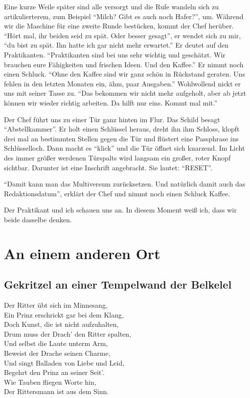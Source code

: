 \documentclass[final]{multiversum}
\begin{document}
Eine kurze Weile später sind alle versorgt und die Rufe wandeln sich zu artikulierterem, zum Beispiel \enquote{Milch? Gibt es auch noch Hafer?}, um.
Während wir die Maschine für eine zweite Runde bestücken, kommt der Chef herüber.
\enquote{Hört mal, ihr beiden seid zu spät. Oder besser gesagt}, er wendet sich zu mir, \enquote{du bist zu spät.
Ihn hatte ich gar nicht mehr erwartet.}
Er deutet auf den Praktikanten.
\enquote{Praktikanten sind bei uns sehr wichtig und geschätzt.
Wir brauchen eure Fähigkeiten und frischen Ideen. 
Und den Kaffee.}
Er nimmt noch einen Schluck.
\enquote{Ohne den Kaffee sind wir ganz schön in Rückstand geraten. 
Uns fehlen in den letzten Monaten ein, ähm, paar Ausgaben.}
Wohlwollend nickt er uns mit seiner Tasse zu.
\enquote{Das bekommen wir nicht mehr aufgeholt, aber ab jetzt können wir wieder richtig arbeiten.
Da hilft nur eins. 
Kommt mal mit.}

Der Chef führt uns zu einer Tür ganz hinten im Flur. 
Das Schild besagt \enquote{Abstellkammer}.
Er holt einen Schlüssel heraus, dreht ihn ihm Schloss, klopft drei mal an bestimmten Stellen gegen die Tür und flüstert eine Passphrase ins Schlüsselloch.
Dann macht es \enquote{klick} und die Tür öffnet sich knarzend.
Im Licht des immer größer werdenen Türspalts wird langsam ein großer, roter Knopf sichtbar.
Darunter ist eine Inschrift angebracht.
Sie lautet: \enquote{RESET}.

\enquote{Damit kann man das Multiversum zurücksetzen.
Und natürlich damit auch das Redaktionsdatum}, erklärt der Chef und nimmt noch einen Schluck Kaffee.

Der Praktikant und ich schauen uns an.
In diesem Moment weiß ich, dass wir beide dasselbe denken.


\section{An einem anderen Ort}

\subsection{Gekritzel an einer Tempelwand der Belkelel}
Der Ritter übt sich im Minnesang,\\
Ein Prinz erschrickt gar bei dem Klang,\\
Doch Kunst, die ist nicht aufzuhalten,\\
Drum muss der Drach' den Ritter spalten,\\
Und selbst die Laute unterm Arm,\\
Beweist der Drache seinen Charme,\\
Und singt Balladen von Liebe und Leid,\\
Begehrt den Prinz an seiner Seit'.\\
Wie Tauben fliegen Worte hin,\\
Der Rittersmann ist aus dem Sinn.\\
\end{document}
